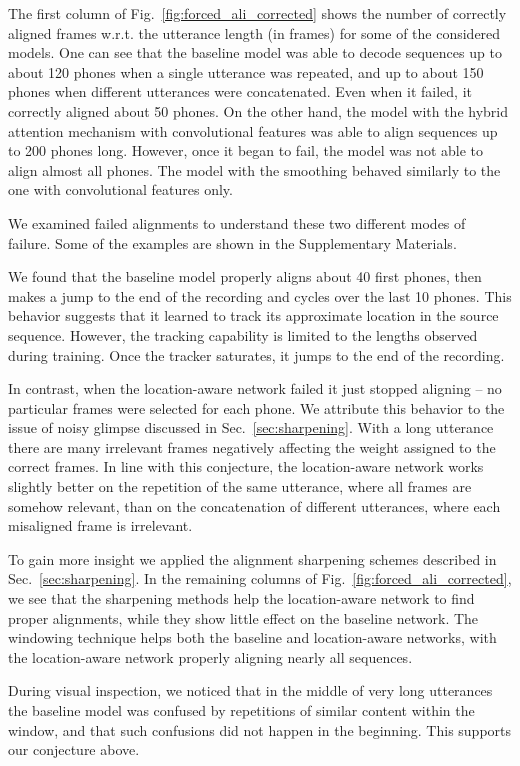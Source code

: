 \documentclass{article}
\begin{document}
The first column of Fig.~\ref{fig:forced_ali_corrected} shows the number of
correctly aligned frames w.r.t. the utterance length (in frames) for some of the
considered models. One can see that the baseline model was able to decode
sequences up to about 120 phones when a single utterance was repeated, and up to
about 150 phones when different utterances were concatenated. Even when it
failed, it correctly aligned about 50 phones. On the other hand, the model with
the hybrid attention mechanism with convolutional features was able to align
sequences up to 200 phones long. However, once it began to fail, the model was
not able to align almost all phones. The model with the smoothing behaved
similarly to the one with convolutional features only.

We examined failed alignments to understand these two different modes of
failure. Some of the examples are shown in the Supplementary Materials.

We found that the baseline model properly aligns about 40 first phones, then
makes a jump to the end of the recording and cycles over the last 10 phones.
This behavior suggests that it learned to track its approximate location in the
source sequence. However, the tracking capability is limited to the lengths
observed during training. Once the tracker saturates, it jumps to the end of the
recording.


In contrast, when the location-aware network failed it just stopped aligning --
no particular frames were selected for each phone.  We attribute this behavior
to the issue of noisy glimpse discussed in Sec.~\ref{sec:sharpening}. With a
long utterance there are many 
irrelevant frames negatively affecting the weight assigned to the correct
frames. In line with this conjecture, the location-aware network works slightly
better on the repetition of the same utterance, where all frames are somehow
relevant, than on the concatenation of different utterances, where each
misaligned frame is irrelevant. 

To gain more insight 
we applied the alignment sharpening schemes described in
Sec.~\ref{sec:sharpening}. In the remaining columns of
Fig.~\ref{fig:forced_ali_corrected}, we see that the sharpening
methods help the location-aware network to find proper alignments, while they
show little effect on the baseline network. 
The windowing technique helps both the baseline and location-aware networks,
with the location-aware network properly aligning nearly all sequences. 

During visual inspection, we noticed that in the middle of very long utterances
the baseline model was confused by repetitions of similar content within the
window, and that such confusions did not happen in the beginning. This supports
our conjecture above.
\end{document}
